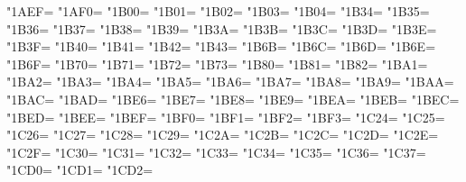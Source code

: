 \XeTeXcharclass"1AEF=\KclassCM
\XeTeXcharclass"1AF0=\KclassCM
\XeTeXcharclass"1B00=\KclassCM
\XeTeXcharclass"1B01=\KclassCM
\XeTeXcharclass"1B02=\KclassCM
\XeTeXcharclass"1B03=\KclassCM
\XeTeXcharclass"1B04=\KclassCM
\XeTeXcharclass"1B34=\KclassCM
\XeTeXcharclass"1B35=\KclassCM
\XeTeXcharclass"1B36=\KclassCM
\XeTeXcharclass"1B37=\KclassCM
\XeTeXcharclass"1B38=\KclassCM
\XeTeXcharclass"1B39=\KclassCM
\XeTeXcharclass"1B3A=\KclassCM
\XeTeXcharclass"1B3B=\KclassCM
\XeTeXcharclass"1B3C=\KclassCM
\XeTeXcharclass"1B3D=\KclassCM
\XeTeXcharclass"1B3E=\KclassCM
\XeTeXcharclass"1B3F=\KclassCM
\XeTeXcharclass"1B40=\KclassCM
\XeTeXcharclass"1B41=\KclassCM
\XeTeXcharclass"1B42=\KclassCM
\XeTeXcharclass"1B43=\KclassCM
\XeTeXcharclass"1B6B=\KclassCM
\XeTeXcharclass"1B6C=\KclassCM
\XeTeXcharclass"1B6D=\KclassCM
\XeTeXcharclass"1B6E=\KclassCM
\XeTeXcharclass"1B6F=\KclassCM
\XeTeXcharclass"1B70=\KclassCM
\XeTeXcharclass"1B71=\KclassCM
\XeTeXcharclass"1B72=\KclassCM
\XeTeXcharclass"1B73=\KclassCM
\XeTeXcharclass"1B80=\KclassCM
\XeTeXcharclass"1B81=\KclassCM
\XeTeXcharclass"1B82=\KclassCM
\XeTeXcharclass"1BA1=\KclassCM
\XeTeXcharclass"1BA2=\KclassCM
\XeTeXcharclass"1BA3=\KclassCM
\XeTeXcharclass"1BA4=\KclassCM
\XeTeXcharclass"1BA5=\KclassCM
\XeTeXcharclass"1BA6=\KclassCM
\XeTeXcharclass"1BA7=\KclassCM
\XeTeXcharclass"1BA8=\KclassCM
\XeTeXcharclass"1BA9=\KclassCM
\XeTeXcharclass"1BAA=\KclassCM
\XeTeXcharclass"1BAC=\KclassCM
\XeTeXcharclass"1BAD=\KclassCM
\XeTeXcharclass"1BE6=\KclassCM
\XeTeXcharclass"1BE7=\KclassCM
\XeTeXcharclass"1BE8=\KclassCM
\XeTeXcharclass"1BE9=\KclassCM
\XeTeXcharclass"1BEA=\KclassCM
\XeTeXcharclass"1BEB=\KclassCM
\XeTeXcharclass"1BEC=\KclassCM
\XeTeXcharclass"1BED=\KclassCM
\XeTeXcharclass"1BEE=\KclassCM
\XeTeXcharclass"1BEF=\KclassCM
\XeTeXcharclass"1BF0=\KclassCM
\XeTeXcharclass"1BF1=\KclassCM
\XeTeXcharclass"1BF2=\KclassCM
\XeTeXcharclass"1BF3=\KclassCM
\XeTeXcharclass"1C24=\KclassCM
\XeTeXcharclass"1C25=\KclassCM
\XeTeXcharclass"1C26=\KclassCM
\XeTeXcharclass"1C27=\KclassCM
\XeTeXcharclass"1C28=\KclassCM
\XeTeXcharclass"1C29=\KclassCM
\XeTeXcharclass"1C2A=\KclassCM
\XeTeXcharclass"1C2B=\KclassCM
\XeTeXcharclass"1C2C=\KclassCM
\XeTeXcharclass"1C2D=\KclassCM
\XeTeXcharclass"1C2E=\KclassCM
\XeTeXcharclass"1C2F=\KclassCM
\XeTeXcharclass"1C30=\KclassCM
\XeTeXcharclass"1C31=\KclassCM
\XeTeXcharclass"1C32=\KclassCM
\XeTeXcharclass"1C33=\KclassCM
\XeTeXcharclass"1C34=\KclassCM
\XeTeXcharclass"1C35=\KclassCM
\XeTeXcharclass"1C36=\KclassCM
\XeTeXcharclass"1C37=\KclassCM
\XeTeXcharclass"1CD0=\KclassCM
\XeTeXcharclass"1CD1=\KclassCM
\XeTeXcharclass"1CD2=\KclassCM
